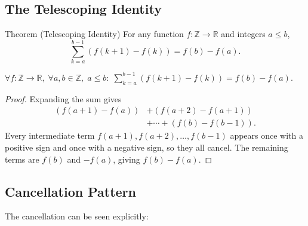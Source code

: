 
\subsection*{The Telescoping Identity}

\begin{theorembox}{Theorem (Telescoping Identity)}
For any function \(f : \mathbb{Z} \to \mathbb{R}\) and integers \(a \le b\),
\[
\sum_{k=a}^{b-1} (f(k+1) - f(k)) = f(b) - f(a).
\]
\end{theorembox}
\label{thm:telescoping}

\begin{remark*}
\(\forall f : \mathbb{Z}\to\mathbb{R},\; \forall a,b \in \mathbb{Z},\; a \le b:\;
\displaystyle\sum_{k=a}^{b-1}(f(k+1)-f(k)) = f(b)-f(a)\).
\end{remark*}

\begin{proof}
Expanding the sum gives
\[
\begin{aligned}
(f(a+1)-f(a)) &+ (f(a+2)-f(a+1)) \\
              &+ \cdots + (f(b)-f(b-1)).
\end{aligned}
\]
Every intermediate term \(f(a+1), f(a+2), \dots, f(b-1)\) appears once
with a positive sign and once with a negative sign, so they all cancel.
The remaining terms are \(f(b)\) and \(-f(a)\), giving \(f(b)-f(a)\).
\end{proof}

\subsection*{Cancellation Pattern}

The cancellation can be seen explicitly:
\begin{center}
\end{center}

